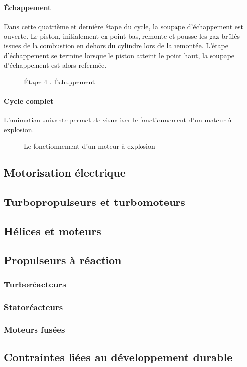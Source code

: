 		
		\paragraph{Échappement}
		
		Dans cette quatrième et dernière étape du cycle, la soupape d'échappement est ouverte. Le piston, initialement en point bas, remonte et pousse les gaz brûlés issues de la combustion en dehors du cylindre lors de la remontée. L'étape d'échappement se termine lorsque le piston atteint le point haut, la soupape d'échappement est alors refermée.
		
		\begin{figure}[H]
  		\centering
		
  		\caption{Étape 4 : Échappement}
		\end{figure}	
		
		\paragraph{Cycle complet}
		
		L'animation suivante permet de visualiser le fonctionnement d'un moteur à explosion.	
		
		\renewcommand{\echelleTikz}{0.5}
		\begin{figure}[H]
  		\centering
  		\caption{Le fonctionnement d'un moteur à explosion}
		\end{figure}	
	
		
	
	\subsection{Motorisation électrique}
	
	\subsection{Turbopropulseurs et turbomoteurs}
	
	\subsection{Hélices et moteurs}
	
	\subsection{Propulseurs à réaction}
		\subsubsection{Turboréacteurs}
	
		\subsubsection{Statoréacteurs}
	
		\subsubsection{Moteurs fusées}
		
	\subsection{Contraintes liées au développement durable}